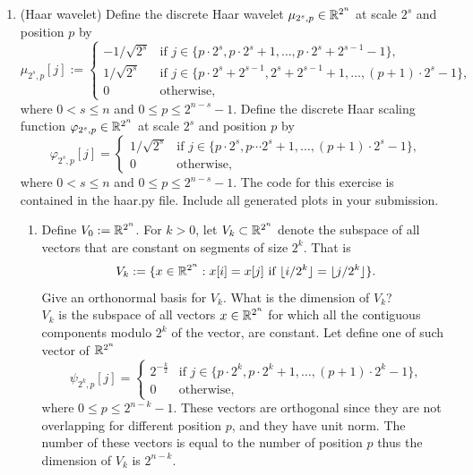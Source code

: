 \documentclass[12pt,twoside]{article}
\begin{document}
\begin{enumerate}
  \newpage
 \item (Haar wavelet) Define the discrete Haar wavelet $\mu_{2^s,p}\in\mathbb{R}^{2^n}$ at scale
  $2^s$ and position $p$ by
  $$\mu_{2^s,p}[j] :=
  \begin{cases}
    -1/\sqrt{2^{s}} & \text{if $j\in\{p\cdot 2^s,p\cdot 2^s+1,\ldots,p\cdot 2^s+2^{s-1}-1\}$,}\\
    1/\sqrt{2^{s}} & \text{if $j\in\{p\cdot 2^s+2^{s-1},2^s+2^{s-1}+1,\ldots,(p+1)\cdot2^{s}-1\}$,}\\
    0 & \text{otherwise,}
  \end{cases}
  $$
  where $0<s\leq n$ and $0 \leq p \leq 2^{n-s}-1$.  Define the
  discrete Haar scaling function $\varphi_{2^s,p}\in\mathbb{R}^{2^n}$ at scale $2^s$ and position $p$  by
  $$\varphi_{2^s,p}[j]=
  \begin{cases}
    1/\sqrt{2^{s}} & \text{if $j\in\{p\cdot 2^s,p\cdots 2^s+1,\ldots,(p+1)\cdot 2^{s}-1\}$,}\\
    0 & \text{otherwise,}
  \end{cases}$$
  where $0<s\leq n$ and $0\leq p\leq 2^{n-s}-1$.
  The code for this
  exercise is contained in the haar.py file. Include all generated plots in your submission.
  \begin{enumerate}
  \item Define $V_0:=\mathbb{R}^{2^n}$.  For $k>0$, let $V_k\subset\mathbb{R}^{2^n}$ denote the subspace
    of all vectors that are constant on segments of size $2^k$.  That
    is
    $$V_k := \{x\in\mathbb{R}^{2^n}: \text{$x[i] = x[j]$ if $\lfloor
      i/2^k\rfloor = \lfloor j/2^k\rfloor$}\}.$$
    Give an orthonormal basis for $V_k$.  What is the dimension of
    $V_k$? \\
    $V_k$ is the subspace of all vectors $x\in\mathbb{R}^{2^n}$ for which all the contiguous components modulo $2^k$ of the vector, are constant.
    Let define one of such vector of $\mathbb{R}^{2^n}$ 
  \begin{equation*}
  \psi_{2^{k},p}[j] =
  \begin{cases}
    2^{-\frac{k}{2}} & \text{if $j\in\{p\cdot 2^k,p\cdot 2^k+1,\ldots,(p+1)\cdot2^{k}-1\}$,}\\
    0 & \text{otherwise,}
    \end{cases}       
\end{equation*}
 where $0 \leq p \leq 2^{n-k}-1$.
 These vectors are orthogonal since they are not overlapping for different position $p$, and they have unit norm.
 The number of these vectors is equal to the number of position $p$ thus the dimension of  $V_k$ is $2^{n-k}$.
 

\end{enumerate}
\end{enumerate}
\end{document}

